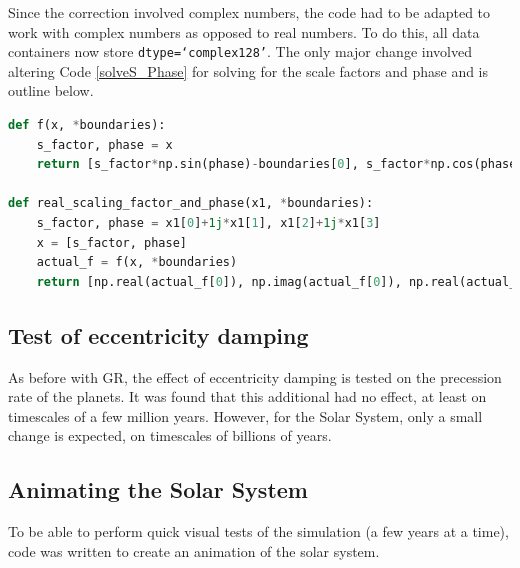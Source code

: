 \documentclass[11pt, oneside]{article}   	%
\begin{document}
Since the correction involved complex numbers, the code had to be adapted to work with complex numbers as opposed to real numbers. To do this, all data containers now store \texttt{dtype=`complex128'}. The only major change involved altering Code \ref{solveS_Phase} for solving for the scale factors and phase and is outline below.
\begin{lstlisting}[language=Python, caption={Change to Code \ref{solveS_Phase}}]
def f(x, *boundaries):
    s_factor, phase = x
    return [s_factor*np.sin(phase)-boundaries[0], s_factor*np.cos(phase)-boundaries[1]]

def real_scaling_factor_and_phase(x1, *boundaries):
    s_factor, phase = x1[0]+1j*x1[1], x1[2]+1j*x1[3] 
    x = [s_factor, phase]
    actual_f = f(x, *boundaries)
    return [np.real(actual_f[0]), np.imag(actual_f[0]), np.real(actual_f[1]), np.imag(actual_f[1])]
\end{lstlisting}

\subsection{Test of eccentricity damping}

As before with GR, the effect of eccentricity damping is tested on the precession rate of the planets. It was found that this additional had no effect, at least on timescales of a few million years. However, for the Solar System, only a small change is expected, on timescales of billions of years.

\subsection{Animating the Solar System}
\label{animation}

To be able to perform quick visual tests of the simulation (a few years at a time), code was written to create an animation of the solar system.
\end{document}

